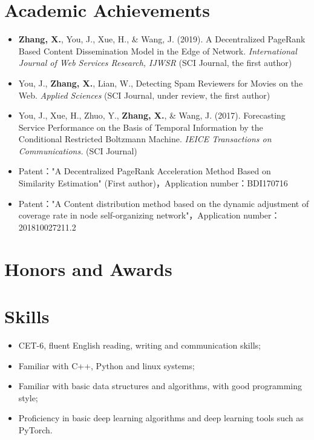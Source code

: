 \documentclass{resume}
\begin{document}
\section{Academic Achievements}
\begin{itemize}[parsep=0.5ex]
  \item \textbf{Zhang, X.}, You, J., Xue, H., \& Wang, J. (2019). A Decentralized PageRank Based Content Dissemination Model in the Edge of Network. \textit{International Journal of Web Services Research, IJWSR} (SCI Journal, the first author)
  \item You, J., \textbf{Zhang, X.}, Lian, W., Detecting Spam Reviewers for Movies on the Web. \textit{Applied Sciences} (SCI Journal, under review, the first author)
  \item You, J., Xue, H., Zhuo, Y., \textbf{Zhang, X.}, \& Wang, J. (2017). Forecasting Service Performance on the Basis of Temporal Information by the Conditional Restricted Boltzmann Machine. \textit{IEICE Transactions on Communications.} (SCI Journal)
  \item Patent："A Decentralized PageRank Acceleration Method Based on Similarity Estimation" (First author)，Application number：BDI170716
  \item Patent："A Content distribution method based on the dynamic adjustment of coverage rate in node self-organizing network"，Application number：201810027211.2
\end{itemize}

\section{Honors and Awards}



\section{Skills}
\begin{itemize}[parsep=0.5ex]
  \item CET-6, fluent English reading, writing and communication skills;
  \item Familiar with C++, Python and linux systems;
  \item Familiar with basic data structures and algorithms, with good programming style;
  \item Proficiency in basic deep learning algorithms and deep learning tools such as PyTorch.
\end{itemize}
\end{document}
